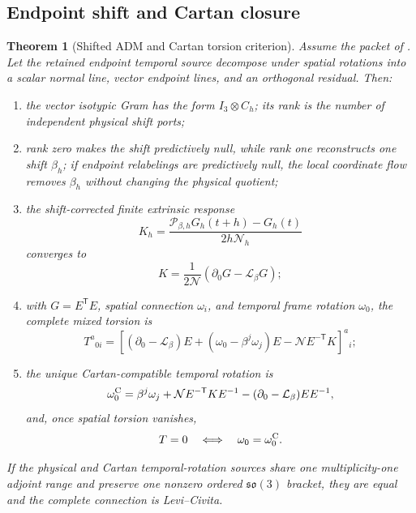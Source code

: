 \documentclass[11pt]{article}
\newtheorem{theorem}{Theorem}[section]
\theoremstyle{definition}
\theoremstyle{remark}
\newcommand{\so}{\mathfrak{so}}
\begin{document}
\subsection{Endpoint shift and Cartan closure}

\begin{theorem}[Shifted ADM and Cartan torsion criterion]
\label{thm:master-Cartan-v036}
Assume the packet of .  Let the retained
endpoint temporal source decompose under spatial rotations into a scalar
normal line, vector endpoint lines, and an orthogonal residual.  Then:
\begin{enumerate}[label=\textup{(\roman*)},leftmargin=2.8em]
\item the vector isotypic Gram has the form \(I_3\otimes C_h\); its rank is the
      number of independent physical shift ports;
\item rank zero makes the shift predictively null, while rank one reconstructs
      one shift \(\beta_h\); if endpoint relabelings are predictively null, the
      local coordinate flow removes \(\beta_h\) without changing the physical
      quotient;
\item the shift-corrected finite extrinsic response
      \[
        K_h=\frac{\mathscr P_{\beta,h}G_h(t+h)-G_h(t)}
                    {2h\mathcal N_h}
      \]
      converges to
      \[
        K=\frac1{2\mathcal N}
        (\partial_0G-\mathcal L_\beta G);
      \]
\item with \(G=E^{\mathsf T}E\), spatial connection \(\omega_i\), and temporal
      frame rotation \(\omega_0\), the complete mixed torsion is
      \[
      T^a{}_{0i}=\left[(\partial_0-\mathcal L_\beta)E
       +(\omega_0-\beta^j\omega_j)E
       -\mathcal N E^{-\mathsf T}K\right]^a{}_i;
      \]
\item the unique Cartan-compatible temporal rotation is
      \[
      \omega_0^{\rm C}=\beta^j\omega_j
       +\mathcal N E^{-\mathsf T}KE^{-1}
       -(\partial_0-\mathcal L_\beta)EE^{-1},
      \]
      and, once spatial torsion vanishes,
      \[
        T=0\quad\Longleftrightarrow\quad
        \omega_0=\omega_0^{\rm C}.
      \]
\end{enumerate}
If the physical and Cartan temporal-rotation sources share one multiplicity-one
adjoint range and preserve one nonzero ordered \(\so(3)\) bracket, they are
equal and the complete connection is Levi--Civita.
\end{theorem}
\end{document}
